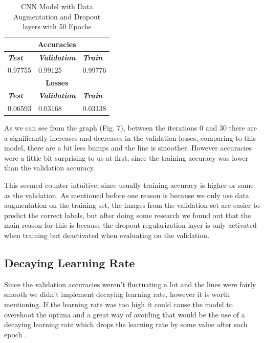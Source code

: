 \documentclass[conference]{IEEEtran}
\begin{document}
\begin{table}[htbp]
\caption{CNN Model with Data Augmentation and Dropout layers with 50 Epochs}
\begin{center}
\begin{tabular}{|p{2cm}|p{2cm}|p{2cm}|}
\hline
\multicolumn{3}{|c|}{\textbf{Accuracies}} \\
\hline
\textbf{\textit{Test}}& \textbf{\textit{Validation}}& \textbf{\textit{Train}} \\
\hline
0.97755 & 0.99125 & 0.99776 \\
\hline
\multicolumn{3}{|c|}{\textbf{Losses}} \\
\hline
\textbf{\textit{Test}}& \textbf{\textit{Validation}}& \textbf{\textit{Train}} \\
\hline
0.06593 & 0.03168 & 0.03138 \\
\hline
\end{tabular}
\end{center}
\end{table}


As we can see from the graph (Fig. 7), between the iterations 0 and 30 there are a significantly increases and decreases in the validation losses, comparing to this model, there are a bit less bumps and the line is smoother. However accuracies were a little bit surprising to us at first, since the training accuracy was lower than the validation accuracy.

This seemed counter intuitive, since usually training accuracy is higher or same as the validation. As mentioned before one reason is because we only use data augmentation on the training set, the images from the validation set are easier to predict the correct labels, but after doing some research we found out that the main reason for this is because the dropout regularization layer is only activated when training but deactivated when evaluating on the validation.


\subsection{Decaying Learning Rate}

Since the validation accuracies weren't fluctuating a lot and the lines were fairly smooth we didn't implement decaying learning rate, however it is worth mentioning. If the learning rate was too high it could cause the model to overshoot the optima and a great way of avoiding that would be the use of a decaying learning rate which drops the learning rate by some value after each epoch \cite{towardsdatascience_jachak}.
\end{document}
